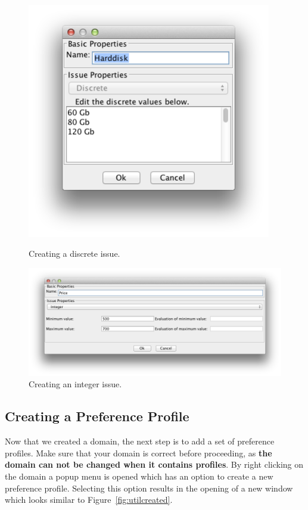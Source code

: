 \documentclass[]{article}
\begin{document}
\begin{figure}[ht]
\center
\begin{minipage}[b]{0.35\linewidth}
	\includegraphics[width=0.95\textwidth]{media/image7a.png}
\caption{Creating a discrete issue.}
\label{fig:createIssueD}
\end{minipage}
\begin{minipage}[b]{0.55\linewidth}
	\includegraphics[width=1.0\textwidth]{media/image7b.png}
\caption{Creating an integer issue.}\label{fig:createIssueI}
\end{minipage}
\end{figure}

\subsection{Creating a Preference Profile}
Now that we created a domain, the next step is to add a set of preference profiles. Make sure that your domain is correct before proceeding, as \textbf{the domain can not be changed when it contains profiles}. By right clicking on the domain a popup menu is opened which has an option to create a new preference profile. Selecting this option results in the opening of a new window which looks similar to Figure~\ref{fig:utilcreated}.
\end{document}
